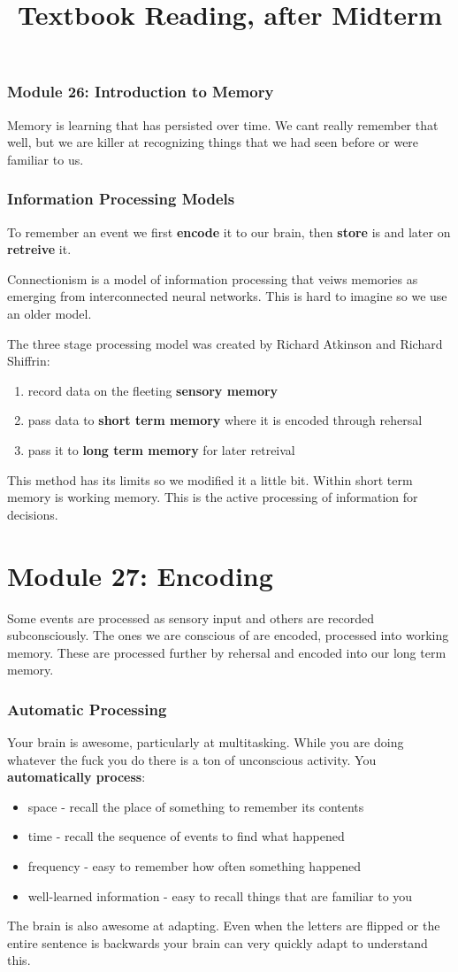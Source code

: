 \documentclass[12pt]{article}
\title{Textbook Reading, after Midterm}
\begin{document}
\section*{Module 26: Introduction to Memory}
Memory is learning that has persisted over time. We cant really remember that well, but we are killer at recognizing things that we had seen before or were familiar to us.
\section*{Information Processing Models}
To remember an event we first \textbf{encode} it to our brain, then \textbf{store} is and later on \textbf{retreive} it.

Connectionism is a model of information processing that veiws memories as emerging from interconnected neural networks. This is hard to imagine so we use an older model.

The three stage processing model was created by Richard Atkinson and Richard Shiffrin:
\begin{enumerate}
\item record data on the fleeting \textbf{sensory memory}
\item pass data to \textbf{short term memory} where it is encoded through rehersal
\item pass it to \textbf{long term memory} for later retreival
\end{enumerate}
This method has its limits so we modified it a little bit. Within short term memory is working memory. This is the active processing of information for decisions. 



\part*{Module 27: Encoding}
Some events are processed as sensory input and others are recorded subconsciously. The ones we are conscious of are encoded, processed into working memory. These are processed further by rehersal and encoded into our long term memory. 
\section*{Automatic Processing}
Your brain is awesome, particularly at multitasking. While you are doing whatever the fuck you do there is a ton of unconscious activity. You \textbf{automatically process}:
\begin{itemize}
\item space - recall the place of something to remember its contents
\item time - recall the sequence of events to find what happened
\item frequency - easy to remember how often something happened
\item well-learned information - easy to recall things that are familiar to you
\end{itemize}
The brain is also awesome at adapting. Even when the letters are flipped or the entire sentence is backwards your brain can very quickly adapt to understand this.
\end{document}
